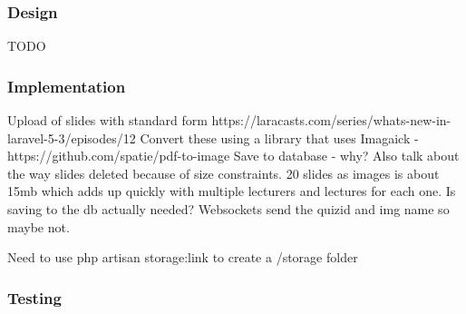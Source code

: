 \subsubsection{Design}
TODO
\subsubsection{Implementation}
Upload of slides with standard form https://laracasts.com/series/whats-new-in-laravel-5-3/episodes/12
Convert these using a library that uses Imagaick - https://github.com/spatie/pdf-to-image
Save to database - why? Also talk about the way slides deleted because of size constraints. 20 slides as images is about 15mb which adds up quickly with multiple lecturers and lectures for each one. Is saving to the db actually needed? Websockets send the quizid and img name so maybe not.

Need to use php artisan storage:link to create a /storage folder
\subsubsection{Testing}
\newpage
